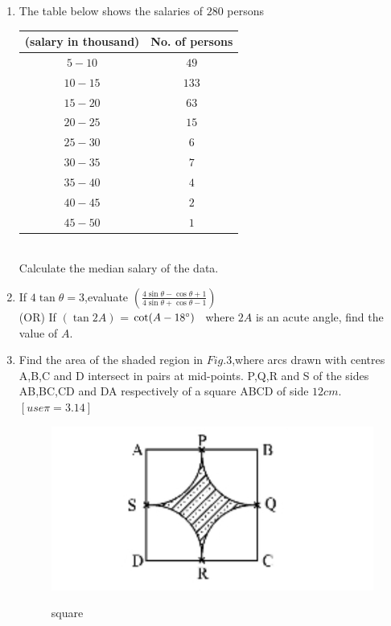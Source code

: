 \documentclass{article}
\begin{document}
\begin{enumerate}
	(OR)
		A heap of rice is in the form of a cone of base diameter $24m$ and height $3.5m$. Find the volume of the rice.How much canvas cloth is required to just cover the heap?
		\item The table below shows the salaries of $280$ persons\\     
			\begin{tabular}{|c|c|}
				\hline
				(salary in thousand\rupee) & No. of persons\\ \hline
				$5-10$ & $49$\\ \hline
				$10-15$ & $133$\\ \hline
				$15-20$ & $63$\\ \hline
				$20-25$ & $15$\\ \hline
				$25-30$ & $6$\\ \hline
				$30-35$ & $7$\\ \hline
				$35-40$ & $4$\\ \hline
				$40-45$ & $2$\\ \hline
				$45-50$ & $1$\\ \hline
			\end{tabular}\\
			Calculate the median salary of the data.
	\item If $4\tan\theta=3$,evaluate $(\frac{4\sin\theta-\cos\theta+1} {4\sin\theta+\cos\theta-1})$ \\
		(OR)
		If $( \tan 2A)$ = $\cot(A - 18\degree)$ \ where \( 2A \) is an acute angle, find the value of \( A \).
	\item Find the area of the shaded region in $Fig. 3$,where arcs drawn with centres A,B,C and D intersect in pairs at mid-points. P,Q,R and S of the sides AB,BC,CD and DA respectively of a square ABCD of side $12cm$.$[use \pi=3.14]$
		\begin{figure}[H]
		\centering                                                       \includegraphics [width=\columnwidth] {./IMAGE1.jpg}                                                                              \label{fig:fig3}                                                 \caption{square}                                               \end{figure}

\end{enumerate}
\end{document}

